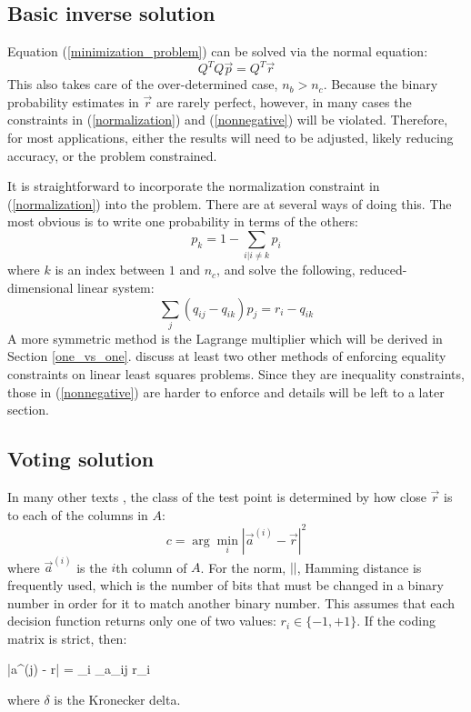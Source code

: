 \subsection{Basic inverse solution}

Equation (\ref{minimization_problem}) can be solved via the normal
equation:
\begin{equation}
	Q^T Q \vec p = Q^T \vec r
	\label{normal_equation}
\end{equation}
This also takes care of the over-determined case, $n_b > n_c$.
Because the binary probability estimates in $\vec r$ are rarely perfect, however,
in many cases the constraints in (\ref{normalization}) and (\ref{nonnegative}) will be violated. 
Therefore, for most applications, either the results will need to be adjusted, likely reducing accuracy, or the problem constrained.

It is straightforward to incorporate the normalization constraint in (\ref{normalization}) into the problem. 
There are at several ways of doing this. The most
obvious is to write one probability in terms of the others:
\begin{equation}
	p_k = 1 - \sum_{i|i \ne k} p_i
	\label{reduce_dimension1}
\end{equation}
where $k$ is an index between $1$ and $n_c$,
and solve the following, reduced-dimensional linear system:
\begin{equation}
	\sum_j (q_{ij} - q_{ik} ) p_j = r_i - q_{ik}
	\label{reduce_dimension2}
\end{equation}
A more symmetric method is the Lagrange multiplier which will be
derived in Section \ref{one_vs_one}.
\citet{Lawson_Hanson1995} discuss at least two other methods of
enforcing equality constraints on linear least squares problems.
Since they are inequality constraints, those in (\ref{nonnegative}) are
harder to enforce and details  will be left to a later section.

\subsection{Voting solution}

In many other texts \citep{Allwein_etal2000, Hsu_Lin2002, Dietterich_Bakiri1995},
the class of the test point is determined by how close $\vec r$
is to each of the columns in $A$:
\begin{equation}
	c = \arg \min_i |\vec a^{(i)} - \vec r|^2
	\label{distance_based_decoding}
\end{equation}
where $\vec a^{(i)}$ is the $i$th column of $A$.
For the norm, $||$, Hamming distance is
frequently used, which is the number of bits that must be changed
in a binary number in order for it to match another binary number.
This assumes that each decision function returns only one of two values: 
$r_i \in \lbrace -1, +1 \rbrace$.
If the coding matrix is strict, then:
\begin{eqnnon}
	|\vec a^{(j)} - \vec r| = \sum_i \delta_{a_{ij} r_i}
\end{eqnnon}
where $\delta$ is the Kronecker delta.

